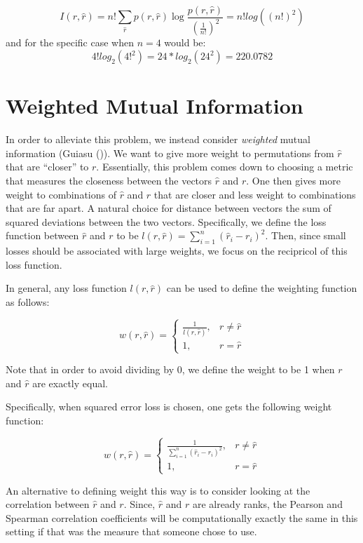 \documentclass[
  12pt,
]{article}
\begin{document}
\[
I(r,\hat{r})= n!\sum_{\hat{r}}p(r,\hat{r})\log \frac {p(r,\hat{r})}{\left(\frac{1}{n!}\right)^2} = n! log((n!)^2)
\] and for the specific case when \(n=4\) would be: \[
4! log_2(4!^2) = 24*log_2(24^2) = 220.0782
\]

\section{Weighted Mutual Information}\label{weighted-mutual-information}

In order to alleviate this problem, we instead consider \emph{weighted}
mutual information (Guiasu ()). We
want to give more weight to permutations from \(\hat{r}\) that are
``closer'' to \(r\). Essentially, this problem comes down to choosing a
metric that measures the closeness between the vectors \(\hat{r}\) and
\(r\). One then gives more weight to combinations of \(\hat{r}\) and
\(r\) that are closer and less weight to combinations that are far
apart. A natural choice for distance between vectors the sum of squared
deviations between the two vectors. Specifically, we define the loss
function between \(\hat{r}\) and \(r\) to be
\(l(r, \hat{r}) = \sum_{i=1}^n (\hat{r}_i - r_i)^2\). Then, since small
losses should be associated with large weights, we focus on the
recipricol of this loss function.

In general, any loss function \(l(r, \hat{r})\) can be used to define
the weighting function as follows:

\[
w(r, \hat{r}) =
\begin{cases}
\frac{1}{l(r, \hat{r})}, & r \ne \hat{r} \\
1, & r = \hat{r}
\end{cases}
\]

Note that in order to avoid dividing by 0, we define the weight to be 1
when \(r\) and \(\hat{r}\) are exactly equal.

Specifically, when squared error loss is chosen, one gets the following
weight function:

\[
w(r, \hat{r}) =
\begin{cases}
\frac{1}{\sum_{i=1}^n (\hat{r}_i - r_i)^2}, & r \ne \hat{r} \\
1, & r = \hat{r}
\end{cases}
\]

An alternative to defining weight this way is to consider looking at the
correlation between \(\hat{r}\) and \(r\). Since, \(\hat{r}\) and \(r\)
are already ranks, the Pearson and Spearman correlation coefficients
will be computationally exactly the same in this setting if that was the
measure that someone chose to use.
\end{document}
